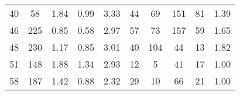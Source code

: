 \begin{tabular}{lccccccccc}
40 &       58 &           1.84 &           0.99 &          3.33 &              44 &              69 &                   151 &                       81 &       1.39 \\
46 &      225 &           0.85 &           0.58 &          2.97 &              57 &              73 &                   157 &                       59 &       1.65 \\
48 &      230 &           1.17 &           0.85 &          3.01 &              40 &             104 &                    44 &                       13 &       1.82 \\
51 &      148 &           1.88 &           1.34 &          2.93 &              12 &               5 &                    41 &                       17 &       1.00 \\
58 &      187 &           1.42 &           0.88 &          2.32 &              29 &              10 &                    66 &                       21 &       1.00 \\
\bottomrule
\end{tabular}
